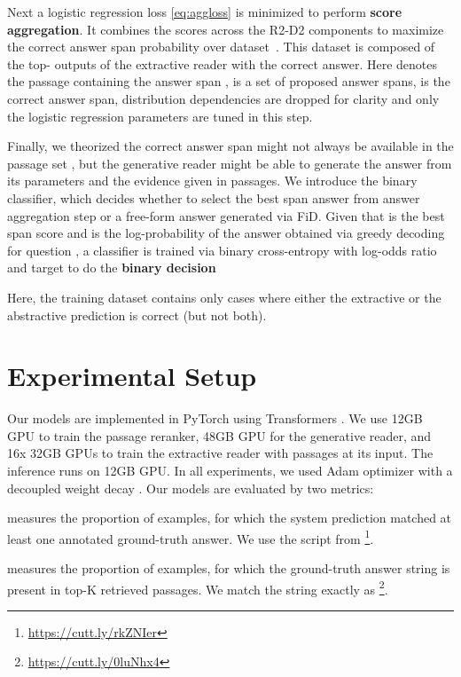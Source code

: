 \documentclass[11pt]{article}
\begin{document}
Next a logistic regression loss \eqref{eq:aggloss} is minimized to perform \textbf{score aggregation}. 
It combines the scores across the R2-D2 components to maximize the correct answer span probability over dataset~. This dataset is composed of the top- outputs of the extractive reader with the correct answer.
Here  denotes the passage containing the answer span ,  is a set of proposed answer spans,  is the correct answer span, distribution dependencies are dropped for clarity and only the logistic regression parameters  are tuned in this step.

Finally, we theorized the correct answer span might not always be available in the passage set , but the generative reader might be able to generate the answer from its parameters and the evidence given in passages. We introduce the binary classifier, which decides whether to select the best span answer from answer aggregation step or a free-form answer generated via FiD. Given that  is the best span score and  is the log-probability of the answer   obtained via greedy decoding for question , a classifier is trained via binary cross-entropy  with log-odds ratio  and target  to do the \textbf{binary decision}

Here, the training dataset  contains only cases where either the extractive or the abstractive prediction is correct (but not both).
\section{Experimental Setup}
Our models are implemented in PyTorch \cite{paszke2019pytorch} using Transformers \cite{wolf-etal-2020-transformers}. We use 12GB GPU to train the passage reranker, 48GB GPU for the generative reader, and 16x 32GB GPUs to train the extractive reader with  passages at its input. The inference runs on 12GB GPU. In all experiments, we used Adam optimizer with a decoupled weight decay \cite{loshchilov2017decoupled}. Our models are evaluated by two metrics:
\begin{description}[style=unboxed,leftmargin=0em,listparindent=\parindent]    \setlength\parskip{0em}
    \item [Exact match (EM)] measures the proportion of examples, for which the system prediction matched at least one annotated ground-truth answer. We use the script from \citet{lee-etal-2019-latent}\footnote{\url{https://cutt.ly/rkZNIer}}.
    \item [Accuracy@K] measures the proportion of examples, for which the ground-truth answer string is present in top-K retrieved passages. We match the string exactly as \citet{karpukhin2020dense}\footnote{\url{https://cutt.ly/0luNhx4}}.
\end{description}
\end{document}
